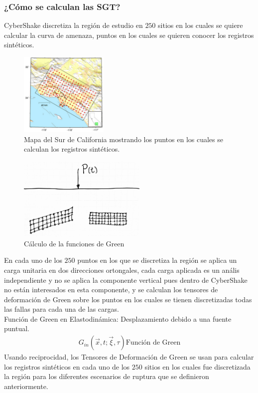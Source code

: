\documentclass{beamer}
\begin{document}
\begin{frame}[allowframebreaks]
\frametitle{¿Cómo se calculan las SGT?}
%
\justifying
%
CyberShake discretiza la región de estudio en $250$ sitios en los cuales se quiere calcular la curva de amenaza, puntos en los cuales se quieren conocer los registros sintéticos.
%
\begin{figure}[h]
	\centering
	\includegraphics[height=4cm]{img/Discretizacion.pdf}
	\caption{Mapa del Sur de California mostrando los puntos en los cuales se calculan los registros sintéticos. \cite[figura 1, página 3]{gravesetal}}
	\vspace{-.5 cm}
\end{figure}
%
%
\begin{figure}[h]
	\centering
	\includegraphics[height=4cm]{img/SGT.pdf}
	\caption{Cálculo de la funciones de Green}
	\vspace{-.5 cm}
\end{figure}
%
%
En cada uno de los $250$ puntos en los que se discretiza la región se aplica un carga unitaria en dos direcciones ortongales, cada carga aplicada es un anális independiente y no se aplica la componente vertical pues dentro de CyberShake no están interesados en esta componente, y se calculan los tensores de deformación de Green sobre los puntos en los cuales se tienen discretizadas todas las fallas para cada una de las cargas.\\
%
Función de Green en Elastodinámica: Desplazamiento debido a una fuente puntual.\\
%
\begin{align*}
	G_{in} \left( \vec{x}, t; \vec{\xi}, \tau \right) \text{Función de Green}
\end{align*}
%
Usando reciprocidad, los Tensores de Deformación de Green se usan para calcular los registros sintéticos en cada uno de los $250$ sitios en los cuales fue discretizada la región para los diferentes escenarios de ruptura que se definieron anteriormente.

\end{frame}
\end{document}
